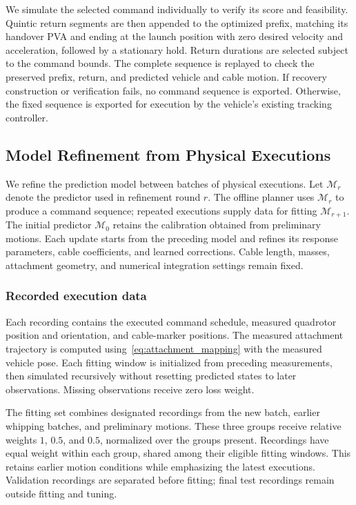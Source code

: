 \documentclass[letterpaper, 10 pt, conference]{ieeeconf}
\begin{document}
We simulate the selected command individually to verify its
score and feasibility. Quintic return segments are then
appended to the optimized prefix, matching its handover PVA
and ending at the launch position with zero desired velocity
and acceleration, followed by a stationary hold.
Return durations are selected subject to the command bounds.
The complete sequence is replayed to check the preserved prefix,
return, and predicted vehicle and cable motion.
If recovery construction or verification fails, no command
sequence is exported. Otherwise, the fixed sequence is exported
for execution by the vehicle's existing tracking controller.



\subsection{Model Refinement from Physical Executions}
\label{subsec:model_refinement}

We refine the prediction model between batches of physical executions.
Let $\mathcal M_r$ denote the predictor used in refinement round $r$.
The offline planner uses $\mathcal M_r$ to produce a command sequence;
repeated executions supply data for fitting $\mathcal M_{r+1}$.
The initial predictor
$\mathcal M_0$ retains the calibration obtained from preliminary
motions. Each update starts from the preceding model and refines
its response parameters, cable coefficients, and learned corrections.
Cable length, masses, attachment geometry, and numerical integration
settings remain fixed.

\subsubsection{Recorded execution data}
Each recording contains the executed command schedule, measured
quadrotor position and orientation, and cable-marker positions.
The measured attachment trajectory is computed
using~\eqref{eq:attachment_mapping} with the measured vehicle pose.
Each fitting window is initialized from preceding measurements,
then simulated recursively without resetting predicted states to
later observations. Missing observations receive zero loss weight.

The fitting set combines designated recordings from the new batch,
earlier whipping batches, and preliminary motions. These three
groups receive relative weights $1$, $0.5$, and $0.5$, normalized
over the groups present. Recordings have equal weight within each
group, shared among their eligible fitting windows. This retains
earlier motion conditions while emphasizing the latest executions.
Validation recordings are separated before fitting; final test
recordings remain outside fitting and tuning.
\end{document}
